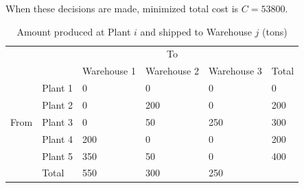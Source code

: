 \documentclass{article}
\begin{document}
When these decisions are made, minimized total cost is $C = 53800$.

\begin{table}[ht]
    \caption{Amount produced at Plant $i$ and shipped to Warehouse $j$ (tons)}
    \centering
    \begin{tabular}{llllll}
        \cline {3-5}
        ~ & \multicolumn{1}{l|}{} & ~ & \multicolumn{1}{c}{To} & \multicolumn{1}{l|}{} & ~ \\ \cline{2-6}
        ~ & \multicolumn{1}{|l|}{} & \multicolumn{1}{l|}{Warehouse 1} & \multicolumn{1}{l|}{Warehouse 2} & \multicolumn{1}{l|}{Warehouse 3} & \multicolumn{1}{l|}{Total} \\ \hline
        \multicolumn{1}{|l|}{} & \multicolumn{1}{l|}{Plant 1} & \multicolumn{1}{l|}{0} & \multicolumn{1}{l|}{0} & \multicolumn{1}{l|}{0} & \multicolumn{1}{l|}{0} \\ \cline{2-6}
        \multicolumn{1}{|l|}{} & \multicolumn{1}{l|}{Plant 2} & \multicolumn{1}{l|}{0} & \multicolumn{1}{l|}{200} & \multicolumn{1}{l|}{0} & \multicolumn{1}{l|}{200} \\ \cline{2-6}
        \multicolumn{1}{|l|}{From} & \multicolumn{1}{l|}{Plant 3} & \multicolumn{1}{l|}{0} & \multicolumn{1}{l|}{50} & \multicolumn{1}{l|}{250} & \multicolumn{1}{l|}{300} \\ \cline{2-6}
        \multicolumn{1}{|l|}{} & \multicolumn{1}{l|}{Plant 4} & \multicolumn{1}{l|}{200} & \multicolumn{1}{l|}{0} & \multicolumn{1}{l|}{0} & \multicolumn{1}{l|}{200} \\ \cline{2-6}
        \multicolumn{1}{|l|}{} & \multicolumn{1}{l|}{Plant 5} & \multicolumn{1}{l|}{350} & \multicolumn{1}{l|}{50} & \multicolumn{1}{l|}{0} & \multicolumn{1}{l|}{400} \\ \hline
        \multicolumn{1}{l|}{} & \multicolumn{1}{l|}{Total} & \multicolumn{1}{l|}{550} & \multicolumn{1}{l|}{300} & \multicolumn{1}{l|}{250} & ~ \\ \cline{2-5}
    \end{tabular}
\end{table}
\end{document}
